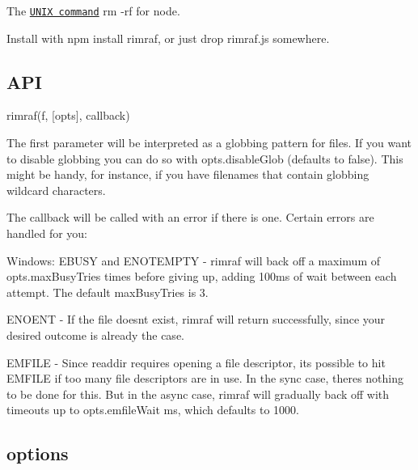 \href{https://travis-ci.org/isaacs/rimraf}{\tt } \href{https://david-dm.org/isaacs/rimraf}{\tt } \href{https://david-dm.org/isaacs/rimraf#info=devDependencies}{\tt }

The \href{http://en.wikipedia.org/wiki/Rm_(Unix)}{\tt U\+N\+IX command} {\ttfamily rm -\/rf} for node.

Install with {\ttfamily npm install rimraf}, or just drop rimraf.\+js somewhere.

\subsection*{A\+PI}

{\ttfamily rimraf(f, \mbox{[}opts\mbox{]}, callback)}

The first parameter will be interpreted as a globbing pattern for files. If you want to disable globbing you can do so with {\ttfamily opts.\+disable\+Glob} (defaults to {\ttfamily false}). This might be handy, for instance, if you have filenames that contain globbing wildcard characters.

The callback will be called with an error if there is one. Certain errors are handled for you\+:


\begin{DoxyItemize}
\item Windows\+: {\ttfamily E\+B\+U\+SY} and {\ttfamily E\+N\+O\+T\+E\+M\+P\+TY} -\/ rimraf will back off a maximum of {\ttfamily opts.\+max\+Busy\+Tries} times before giving up, adding 100ms of wait between each attempt. The default {\ttfamily max\+Busy\+Tries} is 3.
\item {\ttfamily E\+N\+O\+E\+NT} -\/ If the file doesn\textquotesingle{}t exist, rimraf will return successfully, since your desired outcome is already the case.
\item {\ttfamily E\+M\+F\+I\+LE} -\/ Since {\ttfamily readdir} requires opening a file descriptor, it\textquotesingle{}s possible to hit {\ttfamily E\+M\+F\+I\+LE} if too many file descriptors are in use. In the sync case, there\textquotesingle{}s nothing to be done for this. But in the async case, rimraf will gradually back off with timeouts up to {\ttfamily opts.\+emfile\+Wait} ms, which defaults to 1000.
\end{DoxyItemize}

\subsection*{options}


